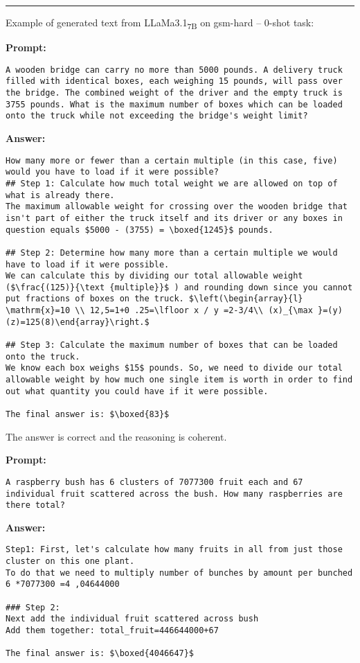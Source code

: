 \noindent\rule{\textwidth}{0.4pt}

\noindent Example of generated text from LLaMa3.1\textsubscript{7B} on gsm-hard -- 0-shot task:
\begin{displayquote}
	\textbf{Prompt:}
	\begin{Verbatim}[fontsize=\small,breaklines]
A wooden bridge can carry no more than 5000 pounds. A delivery truck filled with identical boxes, each weighing 15 pounds, will pass over the bridge. The combined weight of the driver and the empty truck is 3755 pounds. What is the maximum number of boxes which can be loaded onto the truck while not exceeding the bridge's weight limit?
	\end{Verbatim}
	\textbf{Answer:}
	\begin{Verbatim}[fontsize=\small,breaklines]
How many more or fewer than a certain multiple (in this case, five) would you have to load if it were possible?
## Step 1: Calculate how much total weight we are allowed on top of what is already there.
The maximum allowable weight for crossing over the wooden bridge that isn't part of either the truck itself and its driver or any boxes in question equals $5000 - (3755) = \boxed{1245}$ pounds.

## Step 2: Determine how many more than a certain multiple we would have to load if it were possible.
We can calculate this by dividing our total allowable weight ($\frac{(125)}{\text {multiple}}$ ) and rounding down since you cannot put fractions of boxes on the truck. $\left(\begin{array}{l} \mathrm{x}=10 \\ 12,5=1+0 .25=\lfloor x / y =2-3/4\\ (x)_{\max }=(y)(z)=125(8)\end{array}\right.$

## Step 3: Calculate the maximum number of boxes that can be loaded onto the truck.
We know each box weighs $15$ pounds. So, we need to divide our total allowable weight by how much one single item is worth in order to find out what quantity you could have if it were possible.

The final answer is: $\boxed{83}$
	\end{Verbatim}
\end{displayquote}
The answer is correct and the reasoning is coherent.
\begin{displayquote}
	\textbf{Prompt:}
	\begin{Verbatim}[fontsize=\small,breaklines]
A raspberry bush has 6 clusters of 7077300 fruit each and 67 individual fruit scattered across the bush. How many raspberries are there total?
	\end{Verbatim}
	\textbf{Answer:}
	\begin{Verbatim}[fontsize=\small,breaklines]
Step1: First, let's calculate how many fruits in all from just those cluster on this one plant.
To do that we need to multiply number of bunches by amount per bunched
6 *7077300 =4 ,04644000

### Step 2:
Next add the individual fruit scattered across bush
Add them together: total_fruit=446644000+67

The final answer is: $\boxed{4046647}$
	\end{Verbatim}
\end{displayquote}
